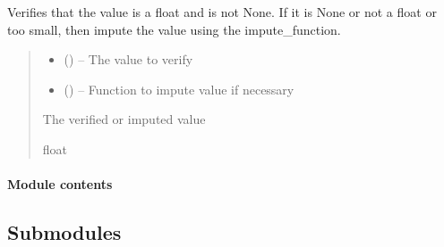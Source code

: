 \documentclass[letterpaper,10pt,english]{sphinxmanual}
\begin{document}
\begin{fulllineitems}
\label{\detokenize{fspsim.utils:fspsim.utils.SpaceObject.verify_value}}
\pysigstartsignatures
{}
\pysigstopsignatures
\sphinxAtStartPar
Verifies that the value is a float and is not None. If it is None or not a float or
too small, then impute the value using the impute\_function.
\begin{quote}\begin{description}
\begin{itemize}
\item {} 
\sphinxAtStartPar
{} () – The value to verify

\item {} 
\sphinxAtStartPar
{} () – Function to impute value if necessary

\end{itemize}

\sphinxAtStartPar
The verified or imputed value

\sphinxAtStartPar
float

\end{description}\end{quote}

\end{fulllineitems}



\paragraph{Module contents}
\label{\detokenize{fspsim.utils:module-fspsim.utils}}\label{\detokenize{fspsim.utils:module-contents}}

\subsection{Submodules}
\label{\detokenize{fspsim:submodules}}
\end{document}
